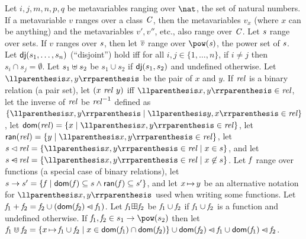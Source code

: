 \documentclass[final]{article}
\begin{document}
%
Let $i, j, m, n, p, q$ be
metavariables ranging over $\SETnat$, the set of natural numbers.
%
%
%
If a metavariable $v$ ranges over a class $\METAclass$, then the
metavariables $v_{x}$ (where $x$ can be anything) and the
metavariables $v', v''$, etc., also range over $\METAclass$.
%
%
%
Let $\METAset$ range over sets.  If $v$ ranges over $\METAset$, then
let $\METAtoset{v}$ range over $\MEMpowset{\METAset}$, the power set
of $\METAset$.
%
%
%
%
Let $\MEMdisj{s_1,\dots,s_n}$ (``disjoint'') hold iff for all
$i,j\in\{1,\dots,n\}$, if $i\not=j$ then $s_i\cap{s_j}=\emptyset$.
%
Let $\MEMdunion{s_1}{s_2}$ be $s_1\cup{s_2}$ if $\MEMdisj{s_1,s_2}$ and
undefined otherwise.
%
%
%
Let $\MEMpair{x}{y}$ be the pair of $x$ and $y$.
%
If $\METArel$ is a binary relation (a pair set),
%
let $(\MEMbrel{x}{\METArel}{y})$ iff $\MEMpair{x}{y}\in\METArel$,
%
let the inverse of $\METArel$ be
$\MEMinverse{\METArel}$ defined as
$\{\MEMpair{x}{y}\mid\MEMpair{y}{x}\in\METArel\}$,
let $\MEMdom{\METArel}=\{x\mid\MEMpair{x}{y}\in\METArel\}$,
let $\MEMran{\METArel}=\{y\mid\MEMpair{x}{y}\in\METArel\}$,
%
let
$\MEMrestrictin{\METArel}{s}=\{\MEMpair{x}{y}\in\METArel\mid{x}\in{s}\}$,
and let
$\MEMrestrictout{\METArel}{s}=\{\MEMpair{x}{y}\in\METArel\mid{x}\not\in{s}\}$.
%
%
%
Let $\METAfun$ range over functions (a special case of binary relations),
let $\MEMfunc{s}{s'}=
\{\METAfun\mid\MEMdom{\METAfun}\subseteq{s}\wedge\MEMran{\METAfun}\subseteq{s'}\}$,
and let $\asgn{x}{y}$ be
an alternative notation for $\MEMpair{x}{y}$ used when
writing some functions.
%
Let $\MEMuplus{\METAfun_1}{\METAfun_2}=\METAfun_2\cup(\MEMrestrictout{\METAfun_1}{\MEMdom{\METAfun_2}})$.
%
Let
$\MEMequnion{\METAfun_1}{\METAfun_2}$ be $\METAfun_1\cup\METAfun_2$ if
$\METAfun_1\cup\METAfun_2$ is a function
and undefined otherwise.
%
If $\METAfun_1,\METAfun_2\in\MEMfunc{s_1}{\MEMpowset{s_2}}$ then let
$\MEMuenv{\METAfun_1}{\METAfun_2}
=\{\asgn{x}{\METAfun_1\cup\METAfun_2}\mid{x}\in\MEMdom{\METAfun_1}\cap\MEMdom{\METAfun_2}\}
\cup
\MEMrestrictout{\METAfun_1}{\MEMdom{\METAfun_2}}
\cup
\MEMrestrictout{\METAfun_2}{\MEMdom{\METAfun_1}}$.
%
\end{document}
